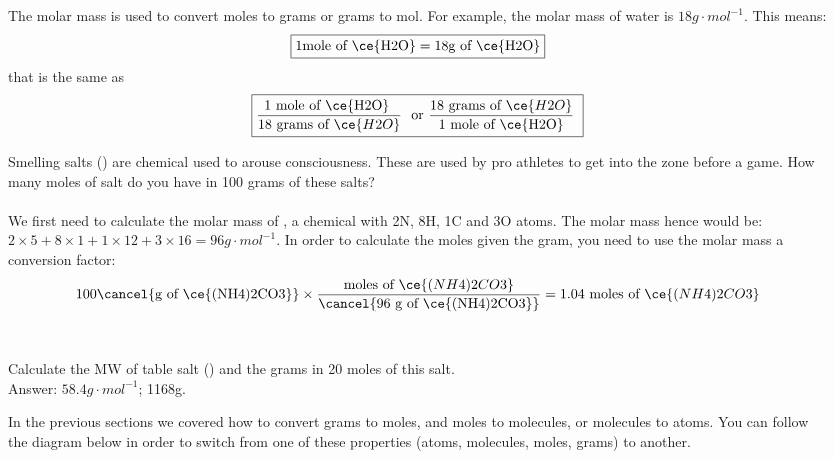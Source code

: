 \documentclass[main.tex]{subfiles}
\begin{document}
\begin{description}
\item[] The molar mass is used to convert moles to grams or grams to mol. For example, the molar mass of water is $18 g\cdot mol^{-1}$. This means:
\begin{equation*}
\boxed{   1 \text{mole of \ce{H2O}}=18 \text{g of \ce{H2O}}   } 
\end{equation*}
that is the same as
\begin{equation*}
\boxed{   \frac{\text{1 mole of \ce{H2O} }}{ \text{18 grams of } \ce{H2O}}\ \text{ or  } \frac{ \text{18 grams of }\ce{H2O} }{\text{1 mole of \ce{H2O}}}\     }
\end{equation*}
\begin{example} %
Smelling salts () are chemical used to arouse consciousness. These are used by pro athletes to get into the zone before a game.  How many moles of salt do you have in 100 grams of these salts? \\
\\
We first need to calculate the molar mass of , a chemical with 2N, 8H, 1C and 3O atoms. The molar mass hence would be: $2\times 5+8\times 1+1\times 12 + 3\times 16=96g\cdot mol^{-1}$. In order to calculate the moles given the gram, you need to use the molar mass a conversion factor:
 \begin{equation*}
100  \cancel{\text{g of \ce{(NH4)2CO3}}} \times 
\dfrac{\text{moles of }\ce{(NH4)2CO3} } { \cancel{\text{96 g of \ce{(NH4)2CO3}}} } 
=\text{1.04 moles of }\ce{(NH4)2CO3}
\end{equation*}\\
\faDiamond\ \\
Calculate the MW of table salt () and the grams in 20 moles of this salt. \\
\flushright Answer: $58.4g\cdot mol^{-1}$; 1168g.
\end{example}%


\item[] In the previous sections we covered how to convert grams to moles, and moles to molecules, or molecules to atoms. You can follow the diagram below in order to switch from one of these properties (atoms, molecules, moles, grams) to another.\\


\end{description}
\end{document}

